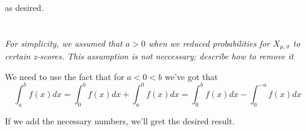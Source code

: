 \documentclass[11pt,oneside,titlepage]{book}
\begin{document}
as desired.

\section{}

\textit{For simplicity, we assumed that $a > 0$ when we reduced probabilities for
  $X_{\mu, \sigma}$ to certain z-scores. This assumption is not neccessary; describe how
  to remove it}

We need to use the fact that for $a < 0 < b$ we've got that
$$\int_a^b{f(x) dx} = \int_0^b{f(x) dx} + \int_a^0{f(x) dx} =
\int_0^b{f(x) dx} - \int_0^{-a}{f(x) dx} $$

If we add the necessary numbers, we'll gret the desired result.
\end{document}
